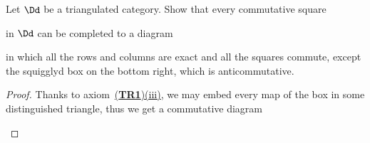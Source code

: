 
\begin{ex}[Verdier]
    Let $\Dd$ be a triangulated category.
    Show that every commutative square
    \begin{center}
    \end{center}
    in $\Dd$ can be completed to a diagram
    \begin{center}
    \end{center}
    in which all the rows and columns are exact
    and all the squares commute,
    except the squigglyd box on the bottom right,
    which is anticommutative.
    \begin{proof}
        Thanks to axiom~\hyperref[TR1]{(\textbf{TR1})(iii)},
        we may embed every map of the box in some distinguished
        triangle, thus we get a commutative diagram
        \begin{center}
\end{center}
\end{proof}
\end{ex}
